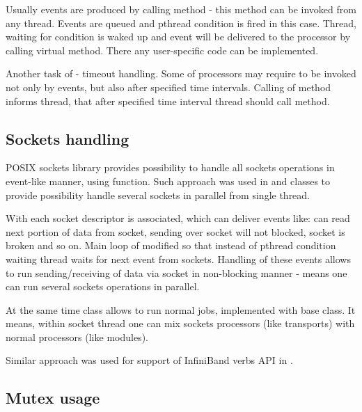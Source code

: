 Usually events are produced by calling  
method - this method can be invoked from any thread. Events are queued and 
pthread condition is fired in this case. Thread, waiting for condition is waked up and
event will be delivered to the processor by calling  
virtual method. There any user-specific code can be implemented.

Another task of  - timeout handling. Some of processors 
may require to be invoked not only by events, but also after specified time intervals.
Calling of method  informs thread, that after
specified time interval thread should call  method.  
 

\subsection{Sockets handling}

POSIX sockets library provides possibility to handle all sockets operations in 
event-like manner, using  function. Such approach was used in  
 and  classes to provide
possibility handle several sockets in parallel from single thread.

With each  socket descriptor is associated, which can
deliver events like: can read next portion of data from socket, 
sending over socket will not blocked, socket is broken and so on.
Main loop of  modified so that instead of pthread condition waiting 
thread waits for next event from sockets.
Handling of these events allows to run sending/receiving of data via socket 
in non-blocking manner - means one can run several sockets operations in parallel.  

At the same time  class allows to run normal jobs,
implemented with base  class. 
It means, within socket thread one can mix sockets processors (like transports) 
with normal processors (like modules).  

Similar approach was used for support of InfiniBand verbs API in \dabc. 


\subsection{Mutex usage}

